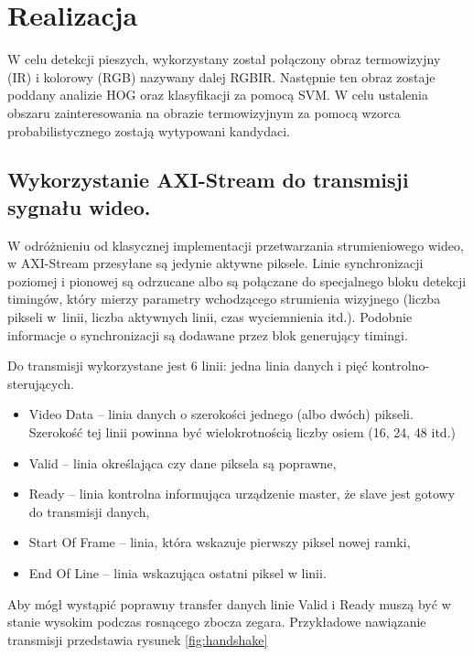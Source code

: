 \chapter{Realizacja}
\label{cha:real}



W celu detekcji pieszych, wykorzystany został połączony obraz termowizyjny (IR) i kolorowy (RGB) nazywany dalej RGBIR. 
Następnie ten obraz zostaje poddany analizie HOG oraz klasyfikacji za pomocą SVM. 
W celu ustalenia obszaru zainteresowania na obrazie termowizyjnym za pomocą wzorca probabilistycznego zostają wytypowani kandydaci. %


\section{Wykorzystanie AXI-Stream do transmisji sygnału wideo.} 
W odróżnieniu od klasycznej implementacji przetwarzania strumieniowego wideo, w AXI-Stream przesyłane są jedynie aktywne piksele. %
Linie synchronizacji poziomej i pionowej są odrzucane albo są połączane do specjalnego bloku detekcji timingów, który mierzy parametry wchodzącego strumienia wizyjnego (liczba pikseli w~linii, liczba aktywnych linii, czas wyciemnienia itd.). 
Podobnie informacje o synchronizacji są dodawane przez blok generujący timingi.

Do transmisji wykorzystane jest 6 linii: jedna linia danych i pięć kontrolno-sterujących. 
\begin{itemize}

\item Video Data -- linia danych o szerokości jednego (albo dwóch) pikseli. Szerokość tej linii powinna być wielokrotnością liczby osiem (16, 24, 48 itd.)
\item Valid -- linia określająca czy dane piksela są poprawne,
\item Ready -- linia kontrolna informująca urządzenie master, że slave jest gotowy do transmisji danych, %
\item Start Of Frame -- linia, która wskazuje pierwszy piksel nowej ramki,
\item End Of Line -- linia wskazująca ostatni piksel w linii. %

\end{itemize}
Aby mógł wystąpić poprawny transfer danych linie Valid i Ready muszą być w stanie wysokim podczas rosnącego zbocza zegara. 
Przykładowe nawiązanie transmisji przedstawia rysunek \ref{fig:handshake}


